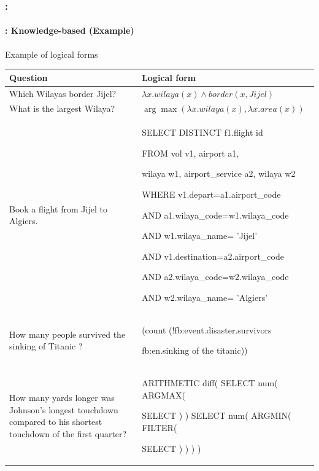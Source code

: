 \documentclass[xcolor=table]{beamer}
\begin{document}
\begin{frame}
	\frametitle{\insertshortsubtitle: \insertsection}
	\framesubtitle{\insertsubsection: Knowledge-based (Example)}
	
	\begin{exampleblock}{Example of logical forms \cite{2020-jurafsky-martin}}
		\centering\tiny\bfseries
		\begin{tabular}{p{}p{}}
			\hline\hline
			Question & Logical form \\
			\hline
			Which Wilayas border Jijel?  
			& $\lambda x.wilaya(x) \wedge border(x, Jijel)$ \\
			
			What is the largest Wilaya? 
			& $\arg\max(\lambda x.wilaya(x), \lambda x.area(x))$ \\
			
			Book a flight from Jijel to Algiers.
			& {\color{blue}SELECT DISTINCT} f1.flight id
			
			{\color{blue}FROM} vol v1, airport  a1,
			
			wilaya w1, airport\_service a2, wilaya w2
			
			{\color{blue}WHERE} v1.depart=a1.airport\_code
			
			{\color{blue}AND} a1.wilaya\_code=w1.wilaya\_code
			
			{\color{blue}AND} w1.wilaya\_name= '{\color{red}Jijel}'
			
			{\color{blue}AND} v1.destination=a2.airport\_code
			
			{\color{blue}AND} a2.wilaya\_code=w2.wilaya\_code
			
			{\color{blue}AND} w2.wilaya\_name= '{\color{red}Algiers}' \\
			
			
			How many people survived the sinking of Titanic ? 
			& (count (!fb:event.disaster.survivors
			
			fb:en.sinking of the titanic))\\
			
			How many yards longer was Johnson's longest touchdown compared to his shortest touchdown of the first quarter?
			& 
			ARITHMETIC diff( SELECT num( ARGMAX(
			
			SELECT ) ) SELECT num( ARGMIN( FILTER(
			
			SELECT ) ) ) )\\
			\hline\hline
		\end{tabular}
	\end{exampleblock}
	
\end{frame}
\end{document}
